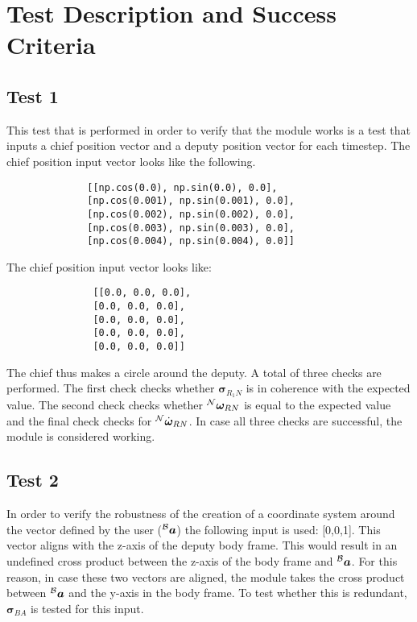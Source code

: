 
\newpage

\section{Test Description and Success Criteria}

\subsection{Test 1}
This test that is performed in order to verify that the module works is a test that inputs a chief position vector and a deputy position vector for each timestep. The chief position input vector looks like the following.

\begin{lstlisting}
              [[np.cos(0.0), np.sin(0.0), 0.0],
              [np.cos(0.001), np.sin(0.001), 0.0],
              [np.cos(0.002), np.sin(0.002), 0.0],
              [np.cos(0.003), np.sin(0.003), 0.0],
              [np.cos(0.004), np.sin(0.004), 0.0]]
\end{lstlisting}

The chief position input vector looks like:

\begin{lstlisting}
               [[0.0, 0.0, 0.0],
               [0.0, 0.0, 0.0],
               [0.0, 0.0, 0.0],
               [0.0, 0.0, 0.0],
               [0.0, 0.0, 0.0]]
\end{lstlisting}

The chief thus makes a circle around the deputy. A total of three checks are performed. The first check checks whether ${\bm \sigma}_{R_{1}N}$ is in coherence with the expected value. The second check checks whether $^{\cal N}{\bm \omega}_{RN}$ is equal to the expected value and the final check checks for $^{\cal N}\dot{\bm \omega}_{RN}$. In case all three checks are successful, the module is considered working.

\subsection{Test 2}
In order to verify the robustness of the creation of a coordinate system around the vector defined by the user ($^{\cal B}{\bm a}$) the following input is used: [0,0,1]. This vector aligns with the z-axis of the deputy body frame. This would result in an undefined cross product between the z-axis of the body frame and $^{\cal B}{\bm a}$.  For this reason, in case these two vectors are aligned, the module takes the cross product between $^{\cal B}{\bm a}$ and the y-axis in the body frame. To test whether this is redundant, ${\bm \sigma}_{BA}$ is tested for this input.

